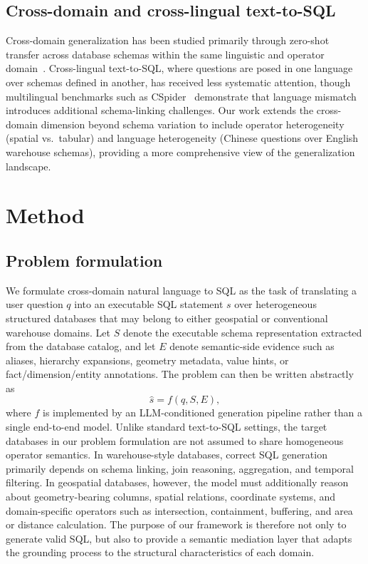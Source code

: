 \documentclass[11pt]{article}
\begin{document}
\subsection{Cross-domain and cross-lingual text-to-SQL}

Cross-domain generalization has been studied primarily through zero-shot transfer across database schemas within the same linguistic and operator domain~\cite{yu2018spider,li2023bird}. Cross-lingual text-to-SQL, where questions are posed in one language over schemas defined in another, has received less systematic attention, though multilingual benchmarks such as CSpider~\cite{min2019cspider} demonstrate that language mismatch introduces additional schema-linking challenges. Our work extends the cross-domain dimension beyond schema variation to include operator heterogeneity (spatial vs.\ tabular) and language heterogeneity (Chinese questions over English warehouse schemas), providing a more comprehensive view of the generalization landscape.

\section{Method}
\label{sec:method}

\subsection{Problem formulation}

We formulate cross-domain natural language to SQL as the task of translating a user question $q$ into an executable SQL statement $s$ over heterogeneous structured databases that may belong to either geospatial or conventional warehouse domains. Let $S$ denote the executable schema representation extracted from the database catalog, and let $E$ denote semantic-side evidence such as aliases, hierarchy expansions, geometry metadata, value hints, or fact/dimension/entity annotations. The problem can then be written abstractly as
\begin{equation}
  \hat{s} = f(q, S, E),
\end{equation}
where $f$ is implemented by an LLM-conditioned generation pipeline rather than a single end-to-end model. Unlike standard text-to-SQL settings, the target databases in our problem formulation are not assumed to share homogeneous operator semantics. In warehouse-style databases, correct SQL generation primarily depends on schema linking, join reasoning, aggregation, and temporal filtering. In geospatial databases, however, the model must additionally reason about geometry-bearing columns, spatial relations, coordinate systems, and domain-specific operators such as intersection, containment, buffering, and area or distance calculation. The purpose of our framework is therefore not only to generate valid SQL, but also to provide a semantic mediation layer that adapts the grounding process to the structural characteristics of each domain.
\end{document}
